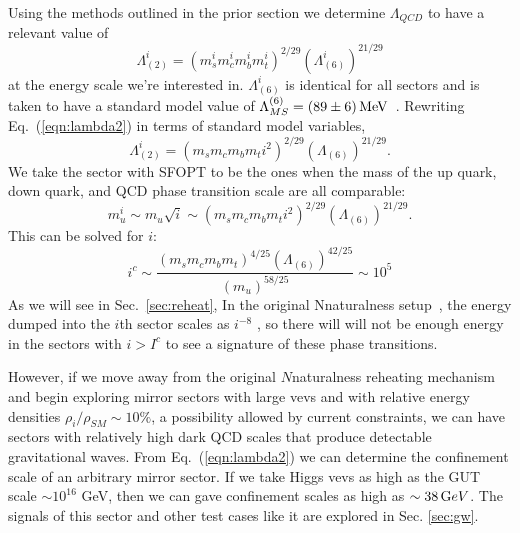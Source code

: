 \documentclass[nofootinbib,twocolumn,preprintnumbers]{revtex4-1}
\begin{document}
Using the methods outlined in the prior section we determine $\Lambda_{QCD}$ to have a relevant value of 
\begin{equation}\label{eqn:lambda2}
\Lambda^i_{(2)} = (m_s^i m_c^i m_b^i m_t^i)^{2/29}(\Lambda^i_{(6)})^{21/29}
\end{equation} 
at the energy scale we're interested in. $\Lambda^i_{(6)}$ is identical for all sectors and is taken to have a standard model value of $\Lambda^{(6)}_{MS} =(89 \pm 6)\, {\rm MeV}$~\cite{PhysRevD.98.030001}. Rewriting Eq.~(\ref{eqn:lambda2}) in terms of standard model variables, 
\begin{equation}\label{eqn:lambda2adj}
\Lambda^i_{(2)} = (m_s m_c m_b m_t i^2)^{2/29}(\Lambda_{(6)})^{21/29}.
\end{equation}
We take the sector with SFOPT to be the ones when the mass of the up quark, down quark, and QCD phase transition scale are all comparable:
\begin{equation}
m^i_u \sim m_u \sqrt{i} \sim (m_s m_c m_b m_t i^2)^{2/29}(\Lambda_{(6)})^{21/29}.
\end{equation}
This can be solved for $i$:
\begin{equation}\label{eqn:critIndex}
i^c \sim \frac{(m_s m_c m_b m_t)^{4/25}(\Lambda_{(6)})^{42/25}}{( m_u)^{58/25}} \sim 10^5
\end{equation}
%
As we will see in Sec.~\ref{sec:reheat}, In the original Nnaturalness setup~\cite{Arkani-Hamed:2016rle}, the energy dumped into the $i$th sector scales as $i^{-8}$ , so there will will not be enough energy in the sectors with $i>I^c$ to see a signature of these phase transitions. 



However, if we move away from the original $N$naturalness reheating mechanism and begin exploring mirror sectors with large vevs and with relative energy densities $\rho_i / \rho_{SM} \sim 10\%$, a possibility allowed by current constraints, we can have sectors with relatively high dark QCD scales that produce detectable gravitational waves. From Eq.~(\ref{eqn:lambda2}) we can determine the confinement scale of an arbitrary mirror sector. If we take Higgs vevs as high as the GUT scale $\sim 10^{16}$ GeV, then we can gave confinement scales as high as $\sim 38 \,{\mathrm GeV}$.  The signals of this sector and other test cases like it are explored in Sec. \ref{sec:gw}. 
\end{document}
